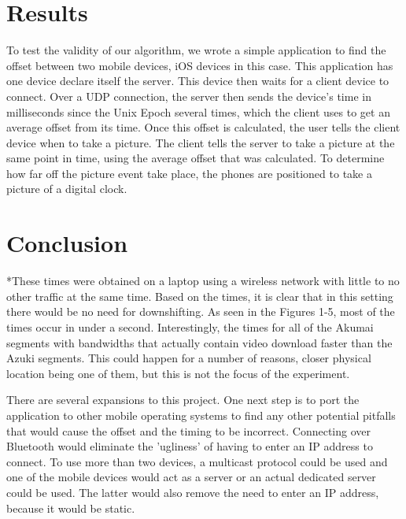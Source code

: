 \documentclass[10pt]{IEEEtran}
\begin{document}
\section{Results}

To test the validity of our algorithm, we wrote a simple application to find 
the offset between two mobile devices, iOS devices in this case. This
application has one device declare itself the server. This device then waits for
a client device to connect. Over a UDP connection, the server then sends the
device's time in milliseconds since the Unix Epoch several times, which the
client uses to get an average offset from its time. Once this offset is
calculated, the user tells the client device when to take a picture. The client
tells the server to take a picture at the same point in time, using the average
offset that was calculated. To determine how far off the picture event take
place, the phones are positioned to take a picture of a digital clock.



\section{Conclusion}

*These times were obtained on a laptop using a wireless network with little to 
no other traffic at the same time. Based on the times, it is clear that in this
setting there would be no need for downshifting. As seen in the Figures 1-5,
most of the times occur in under a second. Interestingly, the times for all of 
the Akumai segments with bandwidths that actually contain video download faster 
than the Azuki segments. This could happen for a number of reasons, closer 
physical location being one of them, but this is not the focus of the 
experiment.

There are several expansions to this project. One next step is to port the 
application to other mobile operating systems to find any other potential 
pitfalls that would cause the offset and the timing to be incorrect. Connecting
over Bluetooth would eliminate the 'ugliness' of having to enter an IP address
to connect. To use more than two devices, a multicast protocol could be used and
one of the mobile devices would act as a server or an actual dedicated server
could be used. The latter would also remove the need to enter an IP address,
because it would be static. 

\begin{thebibliography}{1}



\end{thebibliography}
\end{document}

